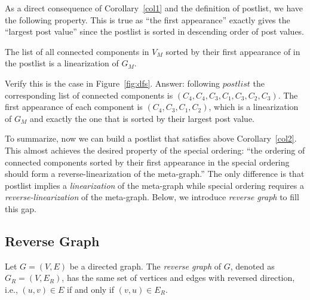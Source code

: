 As a direct consequence of Corollary~\ref{col1} and the definition of postlist, we have the following property.
This is true as ``the first appearance'' exactly gives the ``largest post value'' since the postlist is sorted 
in descending order of post values.

\begin{corollary}
The list of all connected components in $V_M$
sorted by their first appearance of in the postlist is a linearization of $G_M$.
\label{col2}
\end{corollary}

Verify this is the case in Figure~\ref{fig:dfs}. Answer: following $postlist$ the corresponding list of 
connected components is $(C_4, C_4, C_3, C_1, C_3, C_2, C_3)$.
The first appearance of each component is $(C_4, C_3, C_1, C_2)$, which is a linearization of $G_M$
and exactly the one that is sorted by their largest post value.


To summarize, now we can build a postlist that satisfies above Corollary~\ref{col2}.
This almost achieves the desired property of the special ordering:
``the ordering of connected components sorted by their first appearance in the
special ordering should form a reverse-linearization of the meta-graph.''
The only difference is that postlist implies a \emph{linearization} of the meta-graph
while special ordering requires a \emph{reverse-linearization} of the meta-graph.
Below, we introduce \emph{reverse graph} to fill this gap.

\subsection*{Reverse Graph}

\begin{definition}
Let $G = (V,E)$ be a directed graph. The \emph{reverse graph} of $G$, denoted as $G_R = (V, E_R)$,
has the same set of vertices and edges with reversed direction, i.e., $(u,v) \in E$ if and only if $(v,u)\in E_R$.
\end{definition}


